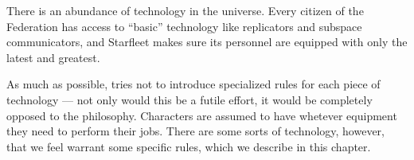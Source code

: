 \documentclass[12pt,titlepage,openany]{book}
\begin{document}
\begin{center}
    \hspace*{1em}
    \hspace*{1em}
\end{center}

\noindent
There is an abundance of technology in the \StarTrek{} universe. Every citizen
of the Federation has access to ``basic'' technology like replicators and
subspace communicators, and Starfleet makes sure its personnel are equipped
with only the latest and greatest.

As much as possible, \StarTrekFate{} tries not to introduce specialized rules
for each piece of technology --- not only would this be a futile effort, it
would be completely opposed to the \Fate{} philosophy. Characters are assumed
to have whetever equipment they need to perform their jobs. There are some
sorts of technology, however, that we feel warrant some specific rules, which
we describe in this chapter.
\end{document}
